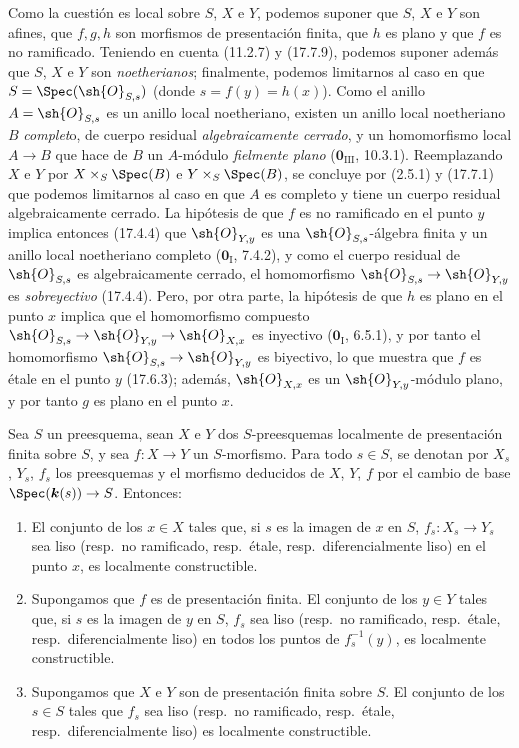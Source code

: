Como la cuestión es local sobre $S$, $X$ e $Y$, podemos suponer que $S$, $X$ e $Y$ son afines, que $f,g,h$ son morfismos de presentación finita, que $h$ es plano y que $f$ es no ramificado. Teniendo en cuenta (11.2.7) y (17.7.9), podemos suponer además que $S$, $X$ e $Y$ son \emph{noetherianos}; finalmente, podemos limitarnos al caso en que $S=\Spec(\sh{O}_{S,s})$ (donde $s=f(y)=h(x)$). Como el anillo $A=\sh{O}_{S,s}$ es un anillo local noetheriano, existen un anillo local noetheriano $B$ \emph{complet}o, de cuerpo residual \emph{algebraicamente cerrado}, y un homomorfismo local $A\to B$ que hace de $B$ un $A$-módulo \emph{fielmente plano} ($\mathbf{0}_{\mathrm{III}}$, 10.3.1). Reemplazando $X$ e $Y$ por $X\times_S\Spec(B)$ e $Y\times_S\Spec(B)$, se concluye por (2.5.1) y (17.7.1) que podemos limitarnos al caso en que $A$ es completo y tiene un cuerpo residual algebraicamente cerrado. La hipótesis de que $f$ es no ramificado en el punto $y$ implica entonces (17.4.4) que $\sh{O}_{Y,y}$ es una $\sh{O}_{S,s}$-álgebra finita y un anillo local noetheriano completo ($\mathbf{0}_{\mathrm I}$, 7.4.2), y como el cuerpo residual de $\sh{O}_{S,s}$ es algebraicamente cerrado, el homomorfismo $\sh{O}_{S,s}\to\sh{O}_{Y,y}$ es \emph{sobreyectivo} (17.4.4). Pero, por otra parte, la hipótesis de que $h$ es plano en el punto $x$ implica que el homomorfismo compuesto $\sh{O}_{S,s}\to\sh{O}_{Y,y}\to\sh{O}_{X,x}$ es inyectivo ($\mathbf{0}_{\mathrm I}$, 6.5.1), y por tanto el homomorfismo $\sh{O}_{S,s}\to\sh{O}_{Y,y}$ es biyectivo, lo que muestra que $f$ es étale en el punto $y$ (17.6.3); además, $\sh{O}_{X,x}$ es un $\sh{O}_{Y,y}$-módulo plano, y por tanto $g$ es plano en el punto $x$.

\begin{proposition}[17.7.11]
\label{IV.17.7.11}
Sea $S$ un preesquema, sean $X$ e $Y$ dos $S$-preesquemas localmente de presentación finita sobre $S$, y sea $f:X\to Y$ un $S$-morfismo. Para todo $s\in S$, se denotan por $X_s$, $Y_s$, $f_s$ los preesquemas y el morfismo deducidos de $X$, $Y$, $f$ por el cambio de base $\Spec(\boldsymbol k(s))\to S$. Entonces:
\begin{enumerate}
  \item[\textup{(i)}] El conjunto de los $x\in X$ tales que, si $s$ es la imagen de $x$ en $S$, $f_s:X_s\to Y_s$ sea liso \textup{(resp.}\ no ramificado, \textup{resp.}\ étale, \textup{resp.}\ diferencialmente liso\textup{)} en el punto $x$, es localmente constructible.
  \item[\textup{(ii)}] Supongamos que $f$ es de presentación finita. El conjunto de los $y\in Y$ tales que, si $s$ es la imagen de $y$ en $S$, $f_s$ sea liso \textup{(resp.}\ no ramificado, \textup{resp.}\ étale, \textup{resp.}\ diferencialmente liso\textup{)} en todos los puntos de $f_s^{-1}(y)$, es localmente constructible.
  \item[\textup{(iii)}] Supongamos que $X$ e $Y$ son de presentación finita sobre $S$. El conjunto de los $s\in S$ tales que $f_s$ sea liso \textup{(resp.}\ no ramificado, \textup{resp.}\ étale, \textup{resp.}\ diferencialmente liso\textup{)} es localmente constructible.
\end{enumerate}
\end{proposition}

